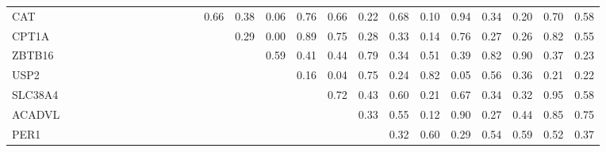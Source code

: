 \begin{longtable}{lrrrrrrrrrrrrrrrrrrrrrrrrr}
CAT      &              &             &             &             &                &             &               &             &            &             &            &           &        0.66 &         0.38 &       0.06 &          0.76 &         0.66 &       0.22 &        0.68 &         0.10 &       0.94 &        0.34 &       0.20 &          0.70 &         0.58 \\
CPT1A    &              &             &             &             &                &             &               &             &            &             &            &           &             &         0.29 &       0.00 &          0.89 &         0.75 &       0.28 &        0.33 &         0.14 &       0.76 &        0.27 &       0.26 &          0.82 &         0.55 \\
ZBTB16   &              &             &             &             &                &             &               &             &            &             &            &           &             &              &       0.59 &          0.41 &         0.44 &       0.79 &        0.34 &         0.51 &       0.39 &        0.82 &       0.90 &          0.37 &         0.23 \\
USP2     &              &             &             &             &                &             &               &             &            &             &            &           &             &              &            &          0.16 &         0.04 &       0.75 &        0.24 &         0.82 &       0.05 &        0.56 &       0.36 &          0.21 &         0.22 \\
SLC38A4  &              &             &             &             &                &             &               &             &            &             &            &           &             &              &            &               &         0.72 &       0.43 &        0.60 &         0.21 &       0.67 &        0.34 &       0.32 &          0.95 &         0.58 \\
ACADVL   &              &             &             &             &                &             &               &             &            &             &            &           &             &              &            &               &              &       0.33 &        0.55 &         0.12 &       0.90 &        0.27 &       0.44 &          0.85 &         0.75 \\
PER1     &              &             &             &             &                &             &               &             &            &             &            &           &             &              &            &               &              &            &        0.32 &         0.60 &       0.29 &        0.54 &       0.59 &          0.52 &         0.37 \\

\end{longtable}
